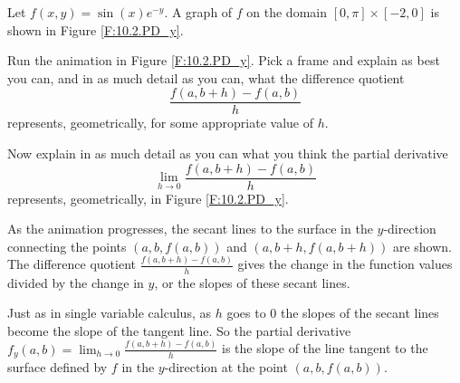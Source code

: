 \begin{activity} \label{A:10.2.4} Let $f(x,y) = \sin(x)e^{-y}$. A graph of $f$ on the domain $[0,\pi] \times [-2,0]$ is shown in Figure \ref{F:10.2.PD_y}.
    \ba
	\item Run the animation in Figure \ref{F:10.2.PD_y}. Pick a frame and explain as best you can, and in as much detail as you can, what the difference quotient
\[\frac{f(a,b+h) - f(a,b)}{h}\]
represents, geometrically, for some appropriate value of $h$.



    \item Now explain in as much detail as you can what you think the partial derivative
\[\lim_{h \to 0} \frac{f(a,b+h) - f(a,b)}{h}\]
represents, geometrically, in Figure \ref{F:10.2.PD_y}.



  \ea

\end{activity}
\begin{smallhint}

\end{smallhint}
\begin{bighint}

\end{bighint}
\begin{activitySolution}
\ba
\item As the animation progresses, the secant lines to the surface in the $y$-direction connecting the points $(a,b,f(a,b))$ and $(a,b+h,f(a,b+h))$ are shown. The difference quotient $\frac{f(a,b+h) - f(a,b)}{h}$ gives the change in the function values divided by the change in $y$, or the slopes of these secant lines.
\item Just as in single variable calculus, as $h$ goes to $0$ the slopes of the secant lines become the slope of the tangent line. So the partial derivative $f_y(a,b) = \lim_{h \to 0} \frac{f(a,b+h) - f(a,b)}{h}$ is the slope of the line tangent to the surface defined by $f$ in the $y$-direction at the point $(a,b, f(a,b))$. 
\ea
\end{activitySolution}
\aftera
